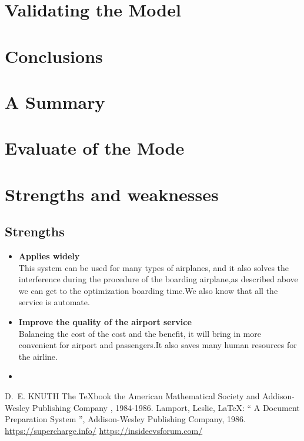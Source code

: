 \documentclass{mcmthesis}
\begin{document}
\section{Validating the Model}


\section{Conclusions}


\section{A Summary}


\section{Evaluate of the Mode}

\section{Strengths and weaknesses}


\subsection{Strengths}
\begin{itemize}
\item \textbf{Applies widely}\\
This  system can be used for many types of airplanes, and it also
solves the interference during  the procedure of the boarding
airplane,as described above we can get to the  optimization
boarding time.We also know that all the service is automate.
\item \textbf{Improve the quality of the airport service}\\
Balancing the cost of the cost and the benefit, it will bring in
more convenient  for airport and passengers.It also saves many
human resources for the airline. 
\item \textbf{}
\end{itemize}

\begin{thebibliography}{99}
 D.~E. KNUTH   The \TeX{}book  the American
Mathematical Society and Addison-Wesley
Publishing Company , 1984-1986.
Lamport, Leslie,  \LaTeX{}: `` A Document Preparation System '',
Addison-Wesley Publishing Company, 1986.
\url{https://supercharge.info/}
\url{https://insideevsforum.com/}
\end{thebibliography}
\end{document}
